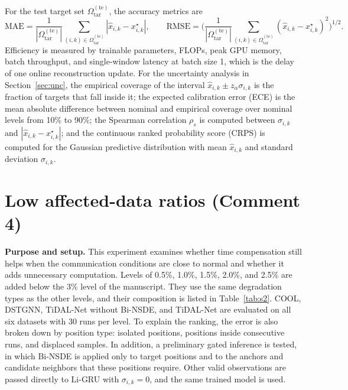 \documentclass[10pt,a4paper]{article}
\begin{document}
For the test target set $\Omega_{\mathrm{tar}}^{(\mathrm{te})}$, the accuracy metrics are
\begin{equation}
\mathrm{MAE}=\frac{1}{|\Omega_{\mathrm{tar}}^{(\mathrm{te})}|}\sum_{(i,k)\in\Omega_{\mathrm{tar}}^{(\mathrm{te})}}\left|\hat x_{i,k}-x^{\star}_{i,k}\right|,\qquad
\mathrm{RMSE}=\Bigg(\frac{1}{|\Omega_{\mathrm{tar}}^{(\mathrm{te})}|}\sum_{(i,k)\in\Omega_{\mathrm{tar}}^{(\mathrm{te})}}\left(\hat x_{i,k}-x^{\star}_{i,k}\right)^2\Bigg)^{1/2}.
\end{equation}
Efficiency is measured by trainable parameters, FLOPs, peak GPU memory, batch throughput, and single-window latency at batch size 1, which is the delay of one online reconstruction update. For the uncertainty analysis in Section~\ref{sec:unc}, the empirical coverage of the interval $\hat x_{i,k}\pm z_{\alpha}\sigma_{i,k}$ is the fraction of targets that fall inside it; the expected calibration error (ECE) is the mean absolute difference between nominal and empirical coverage over nominal levels from 10\% to 90\%; the Spearman correlation $\rho_s$ is computed between $\sigma_{i,k}$ and $|\hat x_{i,k}-x^{\star}_{i,k}|$; and the continuous ranked probability score (CRPS) is computed for the Gaussian predictive distribution with mean $\hat x_{i,k}$ and standard deviation $\sigma_{i,k}$.

\clearpage
\section{Low affected-data ratios (Comment 4)}
\label{sec:low}

\textbf{Purpose and setup.} This experiment examines whether time compensation still helps when the communication conditions are close to normal and whether it adds unnecessary computation. Levels of 0.5\%, 1.0\%, 1.5\%, 2.0\%, and 2.5\% are added below the 3\% level of the manuscript. They use the same degradation types as the other levels, and their composition is listed in Table~\ref{tab:s2}. COOL, DSTGNN, TiDAL-Net without Bi-NSDE, and TiDAL-Net are evaluated on all six datasets with 30 runs per level. To explain the ranking, the error is also broken down by position type: isolated positions, positions inside consecutive runs, and displaced samples. In addition, a preliminary gated inference is tested, in which Bi-NSDE is applied only to target positions and to the anchors and candidate neighbors that these positions require. Other valid observations are passed directly to Li-GRU with $\sigma_{i,k}=0$, and the same trained model is used.
\end{document}
